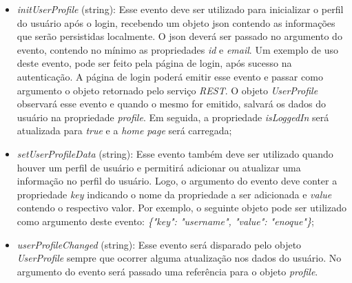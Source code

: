 \begin{itemize}
\begin{itemize}
		\item \textit{initUserProfile} (string): Esse evento deve ser utilizado para inicializar o perfil do usuário após o login, recebendo um objeto json contendo as informações que serão persistidas localmente. O json deverá ser passado no argumento do evento, contendo no mínimo as propriedades \textit{id} e \textit{email}. Um exemplo de uso deste evento, pode ser feito pela página de login, após sucesso na autenticação. A página de login poderá emitir esse evento e passar como argumento o objeto retornado pelo serviço \textit{REST}. O objeto \textit{UserProfile} observará esse evento e quando o mesmo for emitido, salvará os dados do usuário na propriedade \textit{profile}. Em seguida, a propriedade \textit{isLoggedIn} será atualizada para \textit{true} e a \textit{home page} será carregada;

		\item \textit{setUserProfileData} (string): Esse evento também deve ser utilizado quando houver um perfil de usuário e permitirá adicionar ou atualizar uma informação no perfil do usuário. Logo, o argumento do evento deve conter a propriedade \textit{key} indicando o nome da propriedade a ser adicionada e \textit{value} contendo o respectivo valor. Por exemplo, o seguinte objeto pode ser utilizado como argumento deste evento: \textit{\{"key": "username", "value": "enoque"\}};

		\item \textit{userProfileChanged} (string): Esse evento será disparado pelo objeto \textit{UserProfile} sempre que ocorrer alguma atualização nos dados do usuário. No argumento do evento será passado uma referência para o objeto \textit{profile}.
	\end{itemize}
\end{itemize}


